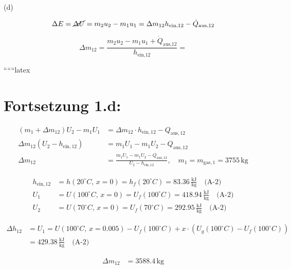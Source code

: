 (d) 

\[
\Delta E = \cancel{\Delta U} = m_2 u_2 - m_1 u_1 = \Delta m_{12} h_{\text{ein,12}} - \dot{Q}_{\text{aus,12}}
\]

\[
\Delta m_{12} = \frac{m_2 u_2 - m_1 u_1 + \dot{Q}_{\text{aus,12}}}{h_{\text{ein,12}}} =
\]

``````latex


\section*{Fortsetzung 1.d:}

\begin{align*}
(m_1 + \Delta m_{12}) U_2 - m_1 U_1 &= \Delta m_{12} \cdot h_{\text{ein},12} - Q_{\text{aus},12} \\
\Delta m_{12} (U_2 - h_{\text{ein},12}) &= m_1 U_1 - m_1 U_2 - Q_{\text{aus},12} \\
\Delta m_{12} &= \frac{m_1 U_1 - m_1 U_2 - Q_{\text{aus},12}}{U_2 - h_{\text{ein},12}}, \quad m_1 = m_{\text{gas},1} = 3755 \, \text{kg}
\end{align*}

\begin{align*}
h_{\text{ein},12} &= h(20^\circ C, \, x=0) = h_f(20^\circ C) = 83.36 \, \frac{\text{kJ}}{\text{kg}} \quad \text{(A-2)} \\
U_1 &= U(100^\circ C, \, x=0) = U_f(100^\circ C) = 418.94 \, \frac{\text{kJ}}{\text{kg}} \quad \text{(A-2)} \\
U_2 &= U(70^\circ C, \, x=0) = U_f(70^\circ C) = 292.95 \, \frac{\text{kJ}}{\text{kg}} \quad \text{(A-2)}
\end{align*}

\begin{align*}
\Delta h_{12} &= U_1 = U(100^\circ C, \, x=0.005) - U_f(100^\circ C) + x \cdot (U_g(100^\circ C) - U_f(100^\circ C)) \\
&= 429.38 \, \frac{\text{kJ}}{\text{kg}} \quad \text{(A-2)}
\end{align*}

\begin{align*}
\Delta m_{12} &= 3588.4 \, \text{kg}
\end{align*}
